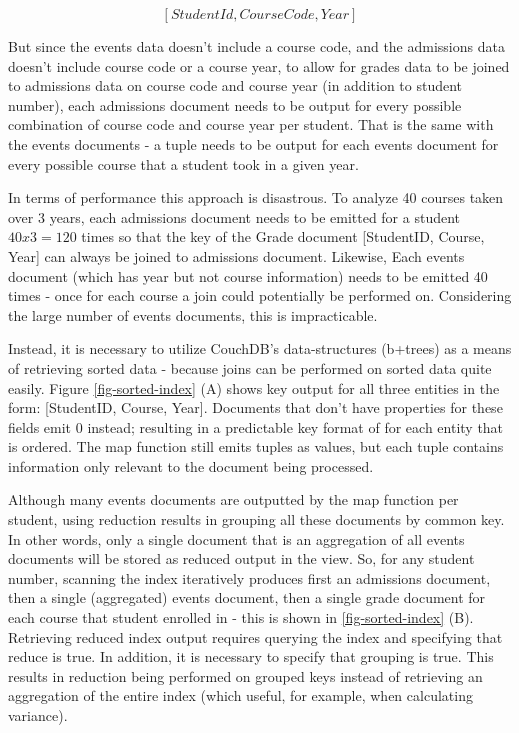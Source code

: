 \[[StudentId,CourseCode,Year]\]

But since the events data doesn't include a course code, and the admissions data doesn't include course code or a course year, to allow for grades data to be joined to admissions data on course code and course year (in addition to student number), each admissions document needs to be output for every possible combination of course code and course year per student. That is the same with the events documents - a tuple needs to be output for each events document for every possible course that a student took in a given year.

In terms of performance this approach is disastrous. To analyze 40 courses taken over 3 years, each admissions document needs to be emitted for a student $40 x 3 = 120$ times so that the key of the Grade document [StudentID, Course, Year] can always be joined to admissions document. Likewise, Each events document (which has year but not course information) needs to be emitted 40 times - once for each course a join could potentially be performed on. Considering the large number of events documents, this is impracticable.

Instead, it is necessary to utilize CouchDB's data-structures (b+trees) as a means of retrieving sorted data - because joins can be performed on sorted data quite easily. Figure \ref{fig-sorted-index} (A) shows key output for all three entities in the form: [StudentID, Course, Year]. Documents that don't have properties for these fields emit 0 instead; resulting in a predictable key format of for each entity that is ordered. The map function still emits tuples as values, but each tuple contains information only relevant to the document being processed.

Although many events documents are outputted by the map function per student, using reduction results in grouping all these documents by common key. In other words, only a single document that is an aggregation of all events documents will be stored as reduced output in the view. So, for any student number, scanning the index iteratively produces first an admissions document, then a single (aggregated) events document, then a single grade document for each course that student enrolled in - this is shown in \ref{fig-sorted-index} (B). Retrieving reduced index output requires querying the index and specifying that reduce is true. In addition, it is necessary to specify that grouping is true. This results in reduction being performed on grouped keys instead of retrieving an aggregation of the entire index (which useful, for example, when calculating variance).

